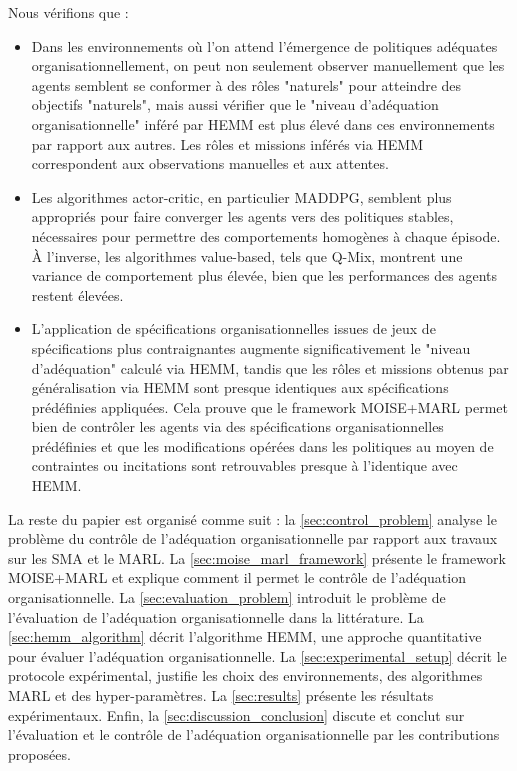 \documentclass[sigconf,anonymous]{aamas}
\begin{document}
\noindent Nous vérifions que :
\begin{itemize}
  \item Dans les environnements où l'on attend l'émergence de politiques adéquates organisationnellement, on peut non seulement observer manuellement que les agents semblent se conformer à des rôles "naturels" pour atteindre des objectifs "naturels", mais aussi vérifier que le "niveau d'adéquation organisationnelle" inféré par HEMM est plus élevé dans ces environnements par rapport aux autres. Les rôles et missions inférés via HEMM correspondent aux observations manuelles et aux attentes.
  \item Les algorithmes actor-critic, en particulier MADDPG, semblent plus appropriés pour faire converger les agents vers des politiques stables, nécessaires pour permettre des comportements homogènes à chaque épisode. À l'inverse, les algorithmes value-based, tels que Q-Mix, montrent une variance de comportement plus élevée, bien que les performances des agents restent élevées.
  \item L'application de spécifications organisationnelles issues de jeux de spécifications plus contraignantes augmente significativement le "niveau d'adéquation" calculé via HEMM, tandis que les rôles et missions obtenus par généralisation via HEMM sont presque identiques aux spécifications prédéfinies appliquées. Cela prouve que le framework MOISE+MARL permet bien de contrôler les agents via des spécifications organisationnelles prédéfinies et que les modifications opérées dans les politiques au moyen de contraintes ou incitations sont retrouvables presque à l'identique avec HEMM.
\end{itemize}

La reste du papier est organisé comme suit : la \autoref{sec:control_problem} analyse le problème du contrôle de l'adéquation organisationnelle par rapport aux travaux sur les SMA et le MARL. La \autoref{sec:moise_marl_framework} présente le framework MOISE+MARL et explique comment il permet le contrôle de l'adéquation organisationnelle. La \autoref{sec:evaluation_problem} introduit le problème de l'évaluation de l'adéquation organisationnelle dans la littérature. La \autoref{sec:hemm_algorithm} décrit l'algorithme HEMM, une approche quantitative pour évaluer l'adéquation organisationnelle. La \autoref{sec:experimental_setup} décrit le protocole expérimental, justifie les choix des environnements, des algorithmes MARL et des hyper-paramètres. La \autoref{sec:results} présente les résultats expérimentaux. Enfin, la \autoref{sec:discussion_conclusion} discute et conclut sur l'évaluation et le contrôle de l'adéquation organisationnelle par les contributions proposées.
\end{document}
